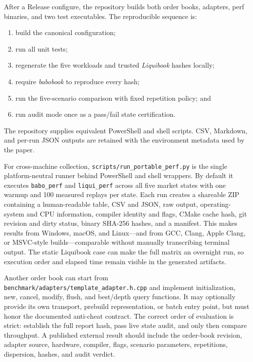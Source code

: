 \documentclass[10pt,twocolumn]{article}
\begin{document}
After a Release configure, the repository builds both order books, adapters, perf
binaries, and two test executables.  The reproducible sequence is:
\begin{enumerate}
  \item build the canonical configuration;
  \item run all unit tests;
  \item regenerate the five workloads and trusted \textit{Liquibook} hashes locally;
  \item require \textit{babobook} to reproduce every hash;
  \item run the five-scenario comparison with fixed repetition policy; and
  \item run audit mode once as a pass/fail state certification.
\end{enumerate}
The repository supplies equivalent PowerShell and shell scripts.  CSV, Markdown,
and per-run JSON outputs are retained with the environment metadata used by the
paper.

For cross-machine collection, \texttt{scripts/run\_portable\_perf.py} is the
single platform-neutral runner behind PowerShell and shell wrappers.  By default
it executes \texttt{babo\_perf} and \texttt{liqui\_perf} across all five market
states with one warmup and 100 measured replays per state.  Each run creates a
shareable ZIP containing a human-readable table, CSV and JSON, raw output,
operating-system and CPU information, compiler identity and flags, CMake cache
hash, git revision and dirty status, binary SHA-256 hashes, and a manifest.  This
makes results from Windows, macOS, and Linux---and from GCC, Clang, Apple Clang,
or MSVC-style builds---comparable without manually transcribing terminal output.
The static Liquibook case can make the full matrix an overnight run, so execution
order and elapsed time remain visible in the generated artifacts.

Another order book can start from \texttt{benchmark/adapters/template\_adapter.h.cpp}
and implement initialization, new, cancel, modify, flush, and best/depth query
functions.  It may optionally provide its own transport, prebuild representation,
or batch entry point, but must honor the documented anti-cheat contract.  The
correct order of evaluation is strict: establish the full report hash, pass live
state audit, and only then compare throughput.  A published external result
should include the order-book revision, adapter source, hardware, compiler, flags,
scenario parameters, repetitions, dispersion, hashes, and audit verdict.
\end{document}
